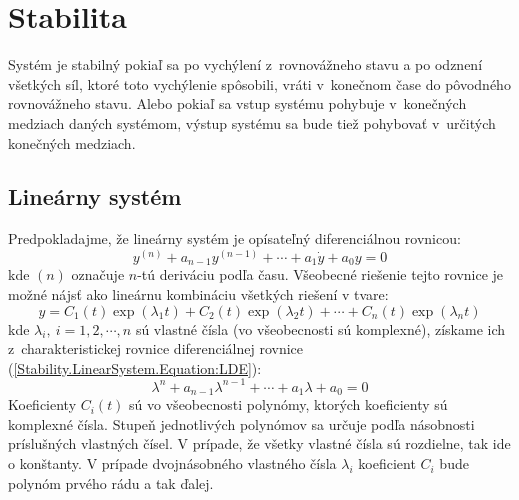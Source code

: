 \documentclass[a4paper, 10pt, ]{article}
\begin{document}
\bigskip

\normalsize
\normalfont

















\section{Stabilita}

Systém je stabilný pokiaľ sa po vychýlení z~rovnovážneho stavu a po odznení všetkých síl, ktoré toto vychýlenie spôsobili, vráti v~konečnom čase do pôvodného rovnovážneho stavu. Alebo pokiaľ sa vstup systému pohybuje v~konečných medziach daných systémom, výstup systému sa bude tiež pohybovať v~určitých konečných medziach.

\subsection{Lineárny systém}
\label{Stability.LinearSystem}

Predpokladajme, že lineárny systém je opísateľný diferenciálnou rovnicou:
\begin{equation}
    \label{Stability.LinearSystem.Equation:LDE}
    y^{(n)} + a_{n - 1} y^{(n - 1)} + \cdots + a_{1} \dot{y} + a_{0} y = 0    
\end{equation}
kde $(n)$ označuje $n$-tú deriváciu podľa času. Všeobecné riešenie tejto rovnice je možné nájsť ako lineárnu kombináciu všetkých riešení v tvare:
\begin{equation}
    \label{Stability.LinearSystem.Equation:LDESolution}
    y = 
    C_{1}(t) \exp(\lambda_{1} t) + C_{2}(t) \exp(\lambda_{2} t) + \cdots + C_{n}(t) \exp(\lambda_{n} t)
\end{equation}
kde $\lambda_{i}, \ i = 1, 2, \cdots, n$ sú vlastné čísla (vo všeobecnosti sú komplexné), získame ich z~charakteristickej rovnice diferenciálnej rovnice (\ref{Stability.LinearSystem.Equation:LDE}):
\begin{equation}
    \lambda^{n} + a_{n - 1} \lambda^{n - 1} + \cdots + a_{1} \lambda + a_{0} = 0    
\end{equation} 
Koeficienty $C_i(t)$ sú vo všeobecnosti polynómy, ktorých koeficienty sú komplexné čísla. Stupeň jednotlivých polynómov sa určuje podľa násobnosti príslušných vlastných čísel. V prípade, že všetky vlastné čísla sú rozdielne, tak ide o konštanty. V prípade dvojnásobného vlastného čísla $\lambda_{i}$ koeficient $C_{i}$ bude polynóm prvého rádu a tak ďalej.
\end{document}
